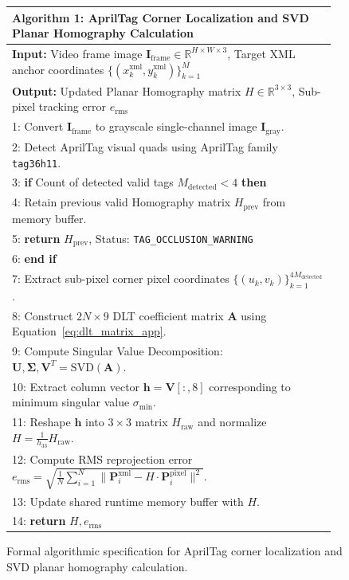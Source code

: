 \begin{figure}[htbp]
\centering
\begin{minipage}{0.92\textwidth}
\small
\setlength{\extrarowheight}{2pt}
\begin{tabular}{|p{0.96\linewidth}|}
\hline
\textbf{Algorithm 1: AprilTag Corner Localization and SVD Planar Homography Calculation} \\
\hline
{\small\sffamily \textbf{Input:} Video frame image $\mathbf{I}_{\text{frame}} \in \mathbb{R}^{H \times W \times 3}$, Target XML anchor coordinates $\{(x_k^{\text{xml}}, y_k^{\text{xml}})\}_{k=1}^M$} \\
{\small\sffamily \textbf{Output:} Updated Planar Homography matrix $H \in \mathbb{R}^{3 \times 3}$, Sub-pixel tracking error $e_{\text{rms}}$} \\
{\small 1: Convert $\mathbf{I}_{\text{frame}}$ to grayscale single-channel image $\mathbf{I}_{\text{gray}}$.} \\
{\small 2: Detect AprilTag visual quads using AprilTag family \texttt{tag36h11}.} \\
{\small 3: \textbf{if} Count of detected valid tags $M_{\text{detected}} < 4$ \textbf{then}} \\
{\small 4: \hspace{1em} Retain previous valid Homography matrix $H_{\text{prev}}$ from memory buffer.} \\
{\small 5: \hspace{1em} \textbf{return} $H_{\text{prev}}$, Status: \texttt{TAG\_OCCLUSION\_WARNING}} \\
{\small 6: \textbf{end if}} \\
{\small 7: Extract sub-pixel corner pixel coordinates $\{(u_k, v_k)\}_{k=1}^{4 M_{\text{detected}}}$.} \\
{\small 8: Construct $2N \times 9$ DLT coefficient matrix $\mathbf{A}$ using Equation~\ref{eq:dlt_matrix_app}.} \\
{\small 9: Compute Singular Value Decomposition: $\mathbf{U}, \mathbf{\Sigma}, \mathbf{V}^T = \text{SVD}(\mathbf{A})$.} \\
{\small 10: Extract column vector $\mathbf{h} = \mathbf{V}[:, 8]$ corresponding to minimum singular value $\sigma_{\min}$.} \\
{\small 11: Reshape $\mathbf{h}$ into $3 \times 3$ matrix $H_{\text{raw}}$ and normalize $H = \frac{1}{h_{33}} H_{\text{raw}}$.} \\
{\small 12: Compute RMS reprojection error $e_{\text{rms}} = \sqrt{\frac{1}{N} \sum_{i=1}^N \| \mathbf{P}_i^{\text{xml}} - H \cdot \mathbf{P}_i^{\text{pixel}} \|^2}$.} \\
{\small 13: Update shared runtime memory buffer with $H$.} \\
{\small 14: \textbf{return} $H, e_{\text{rms}}$} \\
\hline
\end{tabular}
\end{minipage}
\caption{Formal algorithmic specification for AprilTag corner localization and SVD planar homography calculation.}
\label{alg:homography_svd}
\end{figure}

